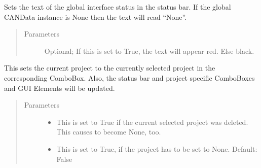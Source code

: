 \documentclass[letterpaper,10pt,english]{sphinxmanual}
\begin{document}
\begin{fulllineitems}
\begin{fulllineitems}
\end{fulllineitems}


\begin{fulllineitems}
\label{\detokenize{src:src.MainTab.MainTab.setGlobalInterfaceStatus}}
Sets the text of the global interface status in the status bar.
If the global CANData instance is None then the text will read “None”.
\begin{quote}\begin{description}
\item[{Parameters}] \leavevmode
{} \textendash{} Optional; If this is set to True, the text will appear red. Else black.

\end{description}\end{quote}

\end{fulllineitems}


\begin{fulllineitems}
\label{\detokenize{src:src.MainTab.MainTab.setProject}}
This sets the current project to the currently selected project in the corresponding ComboBox.
Also, the status bar and project specific ComboBoxes and GUI Elements will be updated.
\begin{quote}\begin{description}
\item[{Parameters}] \leavevmode\begin{itemize}
\item {} 
 \textendash{} This is set to True if the current selected project was deleted. This causes
 to become None, too.

\item {} 
 \textendash{} This is set to True, if the project has to be set to None. Default: False

\end{itemize}

\end{description}\end{quote}


\end{fulllineitems}
\end{fulllineitems}
\end{document}
